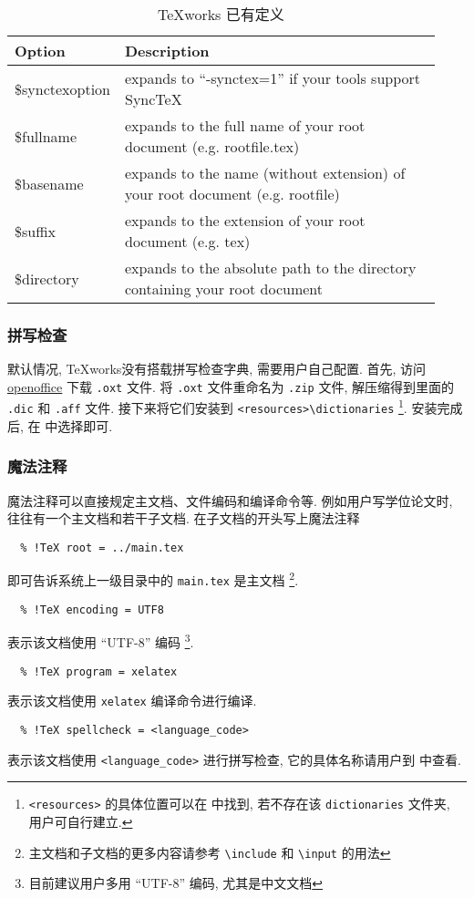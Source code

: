 \begin{table}
  \centering
  \caption{\TeX works 已有定义}\label{tab:variables}
  \begin{tabular}{>{\ttfamily}p{0.18\linewidth}p{0.75\linewidth}}
    \toprule
    Option & Description\\
    \midrule
    \$synctexoption & expands to ``-synctex=1'' if your tools support SyncTeX\\
    \$fullname & expands to the full name of your root document (e.g. rootfile.tex)\\
    \$basename & expands to the name (without extension) of your root document (e.g. rootfile)\\
    \$suffix & expands to the extension of your root document (e.g. tex)\\
    \$directory & expands to the absolute path to the directory containing your root document\\
    \bottomrule
  \end{tabular}
\end{table}

\subsubsection{拼写检查}

默认情况, \TeX works没有搭载拼写检查字典, 需要用户自己配置. 
首先, 访问
\href{https://extensions.openoffice.org/dictionary}{openoffice}
下载 \texttt{.oxt} 文件.
将 \texttt{.oxt} 文件重命名为 \texttt{.zip} 文件,
解压缩得到里面的 \texttt{.dic} 和 \texttt{.aff} 文件.
接下来将它们安装到
\texttt{<resources>\textbackslash dictionaries}%
\footnote{\texttt{<resources>} 的具体位置可以在
 中找到,
若不存在该 \texttt{dictionaries} 文件夹,
用户可自行建立.}. 
安装完成后, 在  中选择即可. 

\subsubsection{魔法注释}

魔法注释可以直接规定主文档、文件编码和编译命令等. 
例如用户写学位论文时, 往往有一个主文档和若干子文档. 
在子文档的开头写上魔法注释
\begin{lstlisting}
  % !TeX root = ../main.tex
\end{lstlisting}
即可告诉系统上一级目录中的 \texttt{main.tex} 是主文档%
\footnote{主文档和子文档的更多内容请参考 \texttt{\textbackslash include}
和 \texttt{\textbackslash input} 的用法}. 
\begin{lstlisting}
  % !TeX encoding = UTF8
\end{lstlisting}
表示该文档使用 ``UTF-8'' 编码%
\footnote{目前建议用户多用 ``UTF-8'' 编码, 尤其是中文文档}. 
\begin{lstlisting}
  % !TeX program = xelatex
\end{lstlisting}
表示该文档使用 \texttt{xelatex} 编译命令进行编译. 
\begin{lstlisting}
  % !TeX spellcheck = <language_code>
\end{lstlisting}
表示该文档使用 \texttt{<language\_code>} 进行拼写检查,
它的具体名称请用户到  中查看. 

